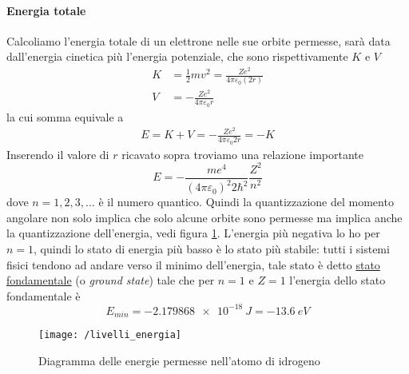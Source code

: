 \paragraph{Energia totale} Calcoliamo l'energia totale di un elettrone nelle sue orbite permesse, sarà data dall'energia cinetica più l'energia potenziale, che sono rispettivamente $K$ e $V$
\begin{equation}
\begin{split}
K & = \frac{ 1}{2 } m v^2 = \frac{ Z e^2}{4 \pi \varepsilon_0 (2r) } \\
V & = - \frac{ Z e^2}{4 \pi \varepsilon_0 r }
\end{split}
\end{equation}
la cui somma equivale a
\begin{equation}
\begin{split}
E = K + V = - \frac{ Z e^2}{4 \pi \varepsilon_0 2 r } = - K
\end{split}
\end{equation}
Inserendo il valore di $r$ ricavato sopra troviamo una relazione importante
\begin{equation}
E = - \frac{ m e^4}{(4\pi \varepsilon_0)^2 2\hbar^2 } \frac{ Z^2}{n^2 }
\label{energia_quantizzata}
\end{equation}
dove $n=1,2,3,...$ è il numero quantico.
Quindi la quantizzazione del momento angolare non solo implica che solo alcune orbite sono permesse ma implica anche la quantizzazione dell'energia, vedi figura \ref{energie_permesse}.
L'energia più negativa lo ho per $n=1$, quindi lo stato di energia più basso è lo stato più stabile: tutti i sistemi fisici tendono ad andare verso il minimo dell'energia, tale stato è detto \underline{stato fondamentale} (o \textit{ground state})
tale che per $n=1$ e $Z=1$ l'energia dello stato fondamentale è
\begin{equation}
E_{min} = -\SI{2.179868e-18}{J} = - \SI{13.6}{eV}
\label{energia_fondamentale}
\end{equation}
\begin{figure}[h]
\centering
\texttt{[image: /livelli\_energia]}
\caption{Diagramma delle energie permesse nell'atomo di idrogeno}
\label{energie_permesse}
\end{figure}
%
